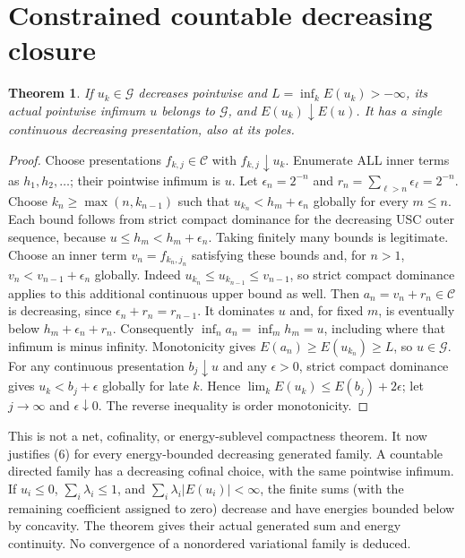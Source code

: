 \documentclass[11pt]{article}
\newtheorem{theorem}{Theorem}
\newcommand{\C}{\mathcal C}
\newcommand{\G}{\mathcal G}
\begin{document}
\section{Constrained countable decreasing closure}
\begin{theorem}
If $u_k\in\G$ decreases pointwise and $L=\inf_kE(u_k)>-\infty$, its actual
pointwise infimum $u$ belongs to $\G$, and $E(u_k)\downarrow E(u)$.
It has a single continuous decreasing presentation, also at its poles.
\end{theorem}
\begin{proof}
Choose presentations $f_{k,j}\in\C$ with $f_{k,j}\downarrow u_k$.
Enumerate ALL inner terms as $h_1,h_2,\ldots$; their pointwise infimum is $u$.
Let $\epsilon_n=2^{-n}$ and $r_n=\sum_{\ell>n}\epsilon_\ell=2^{-n}$.
Choose $k_n\ge\max(n,k_{n-1})$ such that
$u_{k_n}<h_m+\epsilon_n$ globally for every $m\le n$.
Each bound follows from strict compact dominance for the decreasing USC outer
sequence, because $u\le h_m<h_m+\epsilon_n$. Taking finitely many bounds
is legitimate. Choose an inner term $v_n=f_{k_n,j_n}$ satisfying these bounds
and, for $n>1$, $v_n<v_{n-1}+\epsilon_n$ globally. Indeed
$u_{k_n}\le u_{k_{n-1}}\le v_{n-1}$, so strict compact dominance applies
to this additional continuous upper bound as well.
Then $a_n=v_n+r_n\in\C$ is decreasing, since
$\epsilon_n+r_n=r_{n-1}$. It dominates $u$ and, for fixed $m$, is eventually
below $h_m+\epsilon_n+r_n$. Consequently $\inf_na_n=\inf_mh_m=u$,
including where that infimum is minus infinity. Monotonicity gives
$E(a_n)\ge E(u_{k_n})\ge L$, so $u\in\G$.
For any continuous presentation $b_j\downarrow u$ and any $\epsilon>0$,
strict compact dominance gives $u_k<b_j+\epsilon$ globally for late $k$.
Hence $\lim_kE(u_k)\le E(b_j)+2\epsilon$; let $j\to\infty$ and
$\epsilon\downarrow0$. The reverse inequality is order monotonicity.
\end{proof}
This is not a net, cofinality, or energy-sublevel compactness theorem.
It now justifies (6) for every energy-bounded decreasing generated family.
A countable directed family has a decreasing cofinal choice, with the same
pointwise infimum. If $u_i\le0$, $\sum_i\lambda_i\le1$, and
$\sum_i\lambda_i|E(u_i)|<\infty$, the finite sums (with the remaining
coefficient assigned to zero) decrease and have energies bounded below by
concavity. The theorem gives their actual generated sum and energy continuity.
No convergence of a nonordered variational family is deduced.
\end{document}
